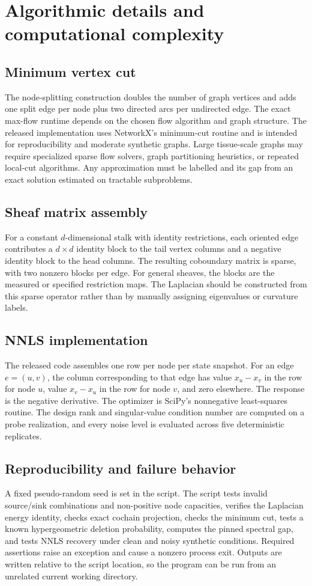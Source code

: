 \documentclass[12pt,a4paper]{article}
\begin{document}
\section{Algorithmic details and computational complexity}
\subsection{Minimum vertex cut}
The node-splitting construction doubles the number of graph vertices and adds one split edge per node plus two directed arcs per undirected edge. The exact max-flow runtime depends on the chosen flow algorithm and graph structure. The released implementation uses NetworkX's minimum-cut routine and is intended for reproducibility and moderate synthetic graphs. Large tissue-scale graphs may require specialized sparse flow solvers, graph partitioning heuristics, or repeated local-cut algorithms. Any approximation must be labelled and its gap from an exact solution estimated on tractable subproblems.

\subsection{Sheaf matrix assembly}
For a constant \(d\)-dimensional stalk with identity restrictions, each oriented edge contributes a \(d\times d\) identity block to the tail vertex columns and a negative identity block to the head columns. The resulting coboundary matrix is sparse, with two nonzero blocks per edge. For general sheaves, the blocks are the measured or specified restriction maps. The Laplacian should be constructed from this sparse operator rather than by manually assigning eigenvalues or curvature labels.

\subsection{NNLS implementation}
The released code assembles one row per node per state snapshot. For an edge \(e=(u,v)\), the column corresponding to that edge has value \(x_u-x_v\) in the row for node \(u\), value \(x_v-x_u\) in the row for node \(v\), and zero elsewhere. The response is the negative derivative. The optimizer is SciPy's nonnegative least-squares routine. The design rank and singular-value condition number are computed on a probe realization, and every noise level is evaluated across five deterministic replicates.

\subsection{Reproducibility and failure behavior}
A fixed pseudo-random seed is set in the script. The script tests invalid source/sink combinations and non-positive node capacities, verifies the Laplacian energy identity, checks exact cochain projection, checks the minimum cut, tests a known hypergeometric deletion probability, computes the pinned spectral gap, and tests NNLS recovery under clean and noisy synthetic conditions. Required assertions raise an exception and cause a nonzero process exit. Outputs are written relative to the script location, so the program can be run from an unrelated current working directory.
\end{document}
